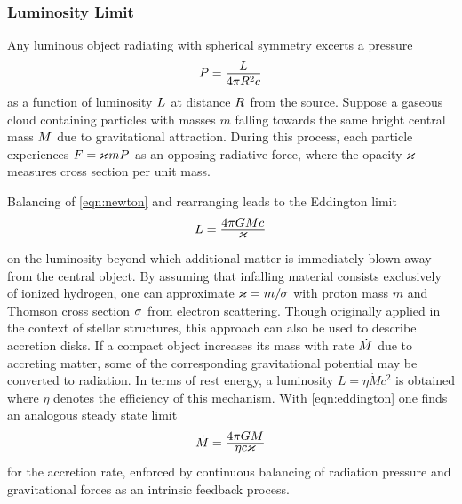 \subsubsection*{Luminosity Limit}

Any luminous object radiating with spherical symmetry excerts a pressure
\begin{equation}
	P = \frac{\raisebox{-0.3ex}{$L$}}{4\pi R^2 c}
\end{equation}
as a function of luminosity $L \kern+0.5pt$ at distance $R \kern+0.5pt$ from the source.
Suppose a gaseous cloud containing particles with masses $m$ falling towards the same bright central mass $M \kern+0.5pt$
due to gravitational attraction. During this process, each particle experiences $F = \kern-0.3pt \varkappa \kern+0.7pt mP \kern+0.5pt$
as an opposing radiative force, where the opacity $\kern-0.3pt \varkappa \kern+0.7pt$ measures cross section per unit mass.

\newpage Balancing of \eqref{eqn:newton} and rearranging leads to the Eddington limit
\begin{equation}
	L = \frac{\raisebox{-0.3ex}{$4\pi GM c \kern+0.4pt$}}{\raisebox{0.8ex}{$\varkappa$}}
	\label{eqn:eddington}
\end{equation}
on the luminosity beyond which additional matter is immediately blown away from the central object. By assuming that infalling
material consists exclusively of ionized hydrogen, one can approximate $\varkappa \kern-0.1pt = m / \kern-0.5pt \sigma \kern+0.3pt$
with proton mass $m$ and Thomson cross section $\sigma \kern+0.5pt$ from electron scattering. Though originally applied in the
context of stellar structures, this approach can also be used to describe accretion disks. If a compact object increases its mass
with rate $\dot{M} \kern+0.5pt$ due to accreting matter, some of the corresponding gravitational potential may be converted to
radiation. In terms of rest energy, a luminosity $L = \eta\dot{M}c^2$ is obtained where $\eta$ denotes the efficiency of this
mechanism. With \eqref{eqn:eddington} one finds an analogous steady state limit
\begin{equation}
	\dot{M} \kern-0.2pt = \frac{\raisebox{-0.3ex}{$4\pi GM$}}{\raisebox{0.8ex}{$\eta c \varkappa$}}
\end{equation}
for the accretion rate, enforced by continuous balancing of radiation pressure and gravitational forces as an intrinsic feedback process.
